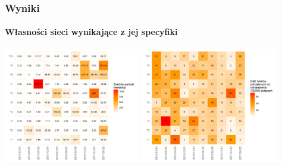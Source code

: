 \documentclass[]{beamer}
\newcommand{\sizequad}{0.45}
\begin{document}
\begin{frame}
 \frametitle{Wyniki}
 \framesubtitle{Własności sieci wynikające z jej specyfiki}
   \begin{minipage}{\textwidth}
     \centering
 		  \includegraphics[width=\sizequad\textwidth]{pictures/wartosc_transakcji/wartosc_transakcji_hm.png}\quad  
  		 \includegraphics[width=\sizequad\textwidth]{pictures/ilosc_blokow/ilosc_blokow_hm.png}  \\

\end{minipage}
\end{frame}
\end{document}
